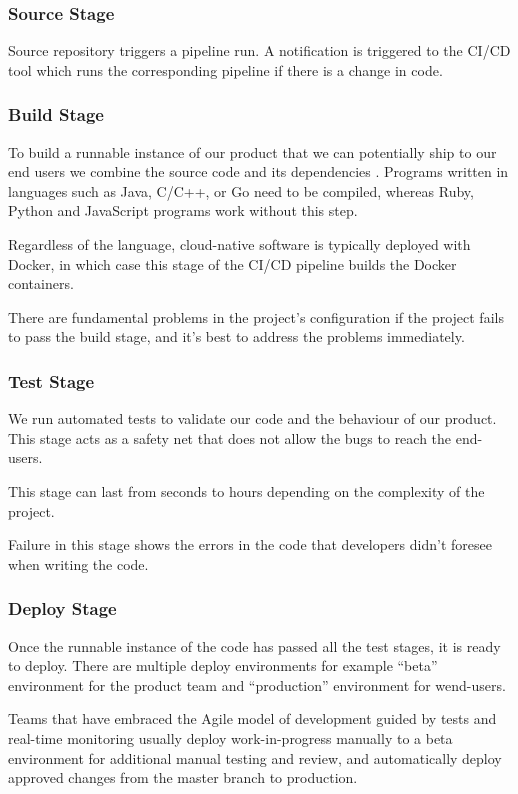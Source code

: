 \subsubsection{Source Stage}
Source repository triggers a pipeline run. A notification is triggered to the CI/CD tool 
which runs the corresponding pipeline  if there is a change in code. 

\subsubsection{Build Stage}
To build a runnable instance of our product that we can potentially ship to our end users we combine 
the source code and its dependencies . Programs written in languages such as Java, C/C++, or Go need 
to be compiled, whereas Ruby, Python and JavaScript programs work without this step.

Regardless of the language, cloud-native software is typically deployed with Docker, in which case this 
stage of the CI/CD pipeline builds the Docker containers.

There are fundamental problems in the project's configuration if the project fails to pass the build 
stage, and it’s best to address the problems  immediately.

\subsubsection{Test Stage}
We run automated tests to validate our code and the behaviour of our product. This stage acts as a safety
net that does not allow the bugs to reach the end-users.

This stage can last from seconds  to  hours depending on the complexity of the project.

Failure in this stage shows the errors in the code that developers didn't foresee when writing the code.

\subsubsection{Deploy Stage}
Once the runnable instance of the code has passed all the test stages, it is ready to deploy. There are 
multiple deploy environments for example “beta” environment for the product team and “production” environment 
for wend-users.

Teams that have embraced the Agile model of development guided by tests and real-time monitoring usually 
deploy work-in-progress manually to a beta environment for additional manual testing and review, and 
automatically deploy approved changes from the master branch to production.


